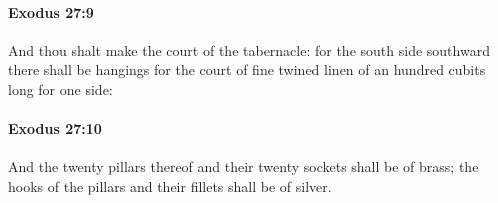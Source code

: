 		\paragraph{Exodus 27:9} %
			\label{EXODUS-27-9}

			And thou shalt make the court of the tabernacle: for the south side southward there shall be hangings for the court of fine twined linen of an hundred cubits long for one side:


		\paragraph{Exodus 27:10} %
			\label{EXODUS-27-10}

			And the twenty pillars thereof and their twenty sockets shall be of brass; the hooks of the pillars and their fillets shall be of silver.


